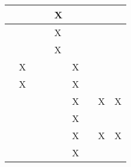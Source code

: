 \begin{longtable}{|l|llllllll|}
    \cite[]{Ivaldi.2272014}       & \multicolumn{1}{l|}{}   & \multicolumn{1}{l|}{}    & \multicolumn{1}{l|}{}  & \multicolumn{1}{l|}{X}   & \multicolumn{1}{l|}{}   & \multicolumn{1}{l|}{}   & \multicolumn{1}{l|}{}   & \multicolumn{1}{l|}{}      \\ \hline
    \cite[]{Ayala.2020}           & \multicolumn{1}{l|}{}   & \multicolumn{1}{l|}{}    & \multicolumn{1}{l|}{}  & \multicolumn{1}{l|}{X}   & \multicolumn{1}{l|}{}   & \multicolumn{1}{l|}{}   & \multicolumn{1}{l|}{}   & \multicolumn{1}{l|}{}      \\ \hline
    \cite[]{Todorov.2012}         & \multicolumn{1}{l|}{}   & \multicolumn{1}{l|}{}    & \multicolumn{1}{l|}{}  & \multicolumn{1}{l|}{X}   & \multicolumn{1}{l|}{}   & \multicolumn{1}{l|}{}   & \multicolumn{1}{l|}{}   & \multicolumn{1}{l|}{}      \\ \hline
    \cite[]{Koch.2018}            & \multicolumn{1}{l|}{X}   & \multicolumn{1}{l|}{}    & \multicolumn{1}{l|}{}   & \multicolumn{1}{l|}{}   & \multicolumn{1}{l|}{X}   & \multicolumn{1}{l|}{}   & \multicolumn{1}{l|}{}   & \multicolumn{1}{l|}{}      \\ \hline
    \cite[]{Deshpande.2020}       & \multicolumn{1}{l|}{X}   & \multicolumn{1}{l|}{}    & \multicolumn{1}{l|}{}   & \multicolumn{1}{l|}{}   & \multicolumn{1}{l|}{X}   & \multicolumn{1}{l|}{}   & \multicolumn{1}{l|}{}   & \multicolumn{1}{l|}{}      \\ \hline
    \cite[]{Deshpande.2021}       & \multicolumn{1}{l|}{}   & \multicolumn{1}{l|}{}    & \multicolumn{1}{l|}{}   & \multicolumn{1}{l|}{}   & \multicolumn{1}{l|}{X}   & \multicolumn{1}{l|}{}   & \multicolumn{1}{l|}{X}   & \multicolumn{1}{l|}{X}      \\ \hline
    \cite[]{Hentati.2018}         & \multicolumn{1}{l|}{}   & \multicolumn{1}{l|}{}    & \multicolumn{1}{l|}{}   & \multicolumn{1}{l|}{}   & \multicolumn{1}{l|}{X}   & \multicolumn{1}{l|}{}   & \multicolumn{1}{l|}{}   & \multicolumn{1}{l|}{}      \\ \hline
    \cite[]{Molchanov.2019}       & \multicolumn{1}{l|}{}   & \multicolumn{1}{l|}{}    & \multicolumn{1}{l|}{}   & \multicolumn{1}{l|}{}   & \multicolumn{1}{l|}{X}   & \multicolumn{1}{l|}{}   & \multicolumn{1}{l|}{X}   & \multicolumn{1}{l|}{X}      \\ \hline
    \cite[]{Furrer.2016}          & \multicolumn{1}{l|}{}   & \multicolumn{1}{l|}{}    & \multicolumn{1}{l|}{}   & \multicolumn{1}{l|}{}   & \multicolumn{1}{l|}{X}   & \multicolumn{1}{l|}{}   & \multicolumn{1}{l|}{}   & \multicolumn{1}{l|}{}      \\ \hline

\end{longtable}
